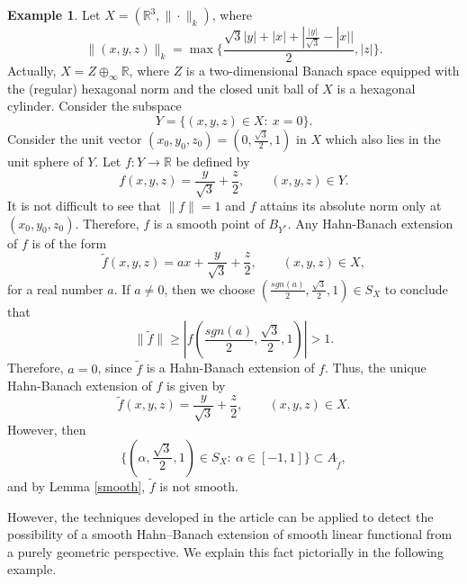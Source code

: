 \documentclass{amsart}
\theoremstyle{definition}
\newtheorem{example}[theorem]{Example}
\theoremstyle{remark}
\numberwithin{equation}{section}
\begin{document}
\begin{example}\label{nonexample: smooth}
Let $X=(\mathbb{R}^3,\|\cdot\|_k)$, where 
\[
\|(x,y,z)\|_k=\max\{\frac{\sqrt{3}|y|+|x|+|\frac{|y|}{\sqrt{3}}-|x||}{2},|z|\}.
\]
Actually, $X=Z\oplus_\infty \mathbb{R}$, where $Z$ is a two-dimensional Banach space equipped with the (regular) hexagonal norm and the closed unit ball of $X$ is a hexagonal cylinder. Consider the subspace 
\[
Y=\{(x,y,z)\in X:~x=0\}.
\]
Consider the unit vector $(x_0,y_0,z_0)=(0,\frac{\sqrt{3}}{2},1)$ in $X$ which also lies in the unit sphere of $Y$. Let $f:Y\to \mathbb{R}$ be defined by
\[
f(x,y,z)= \frac{y}{\sqrt{3}}+\frac{z}{2}, \qquad (x,y,z)\in Y.
\]
It is not difficult to see that $\|f\|=1$ and $f$ attains its absolute norm only at $(x_0,y_0,z_0)$. Therefore, $f$ is a smooth point of $B_{Y^*}$. Any Hahn-Banach extension of $f$ is of the form 
\[
\widetilde{f}(x,y,z)=ax+\frac{y}{\sqrt{3}}+\frac{z}{2}, \qquad (x,y,z)\in X,
\]
for a real number $a$. If $a\neq 0$, then we choose $(\frac{sgn(a)}{2},\frac{\sqrt{3}}{2},1)\in S_X$ to conclude that 
\[
\|\widetilde{f}\|\geq |f(\frac{sgn(a)}{2},\frac{\sqrt{3}}{2},1)|>1.
\]
Therefore, $a=0$, since $\widetilde{f}$ is a Hahn-Banach extension of $f$. Thus, the unique Hahn-Banach extension of $f$ is given by 
\[
\widetilde{f}(x,y,z)=\frac{y}{\sqrt{3}}+\frac{z}{2}, \qquad (x,y,z)\in X.
\]
However, then
\[
\{(\alpha,\frac{\sqrt{3}}{2},1)\in S_X:~ \alpha\in [-1,1]\}\subset A_{\widetilde{f}},
\]
and by Lemma \ref{smooth}, $\widetilde{f}$ is not smooth.
\end{example}

\noindent However, the techniques developed in the article can be applied to detect the possibility of a smooth Hahn--Banach extension of smooth linear functional from a purely geometric perspective. We explain this fact pictorially in the following example.
\end{document}
